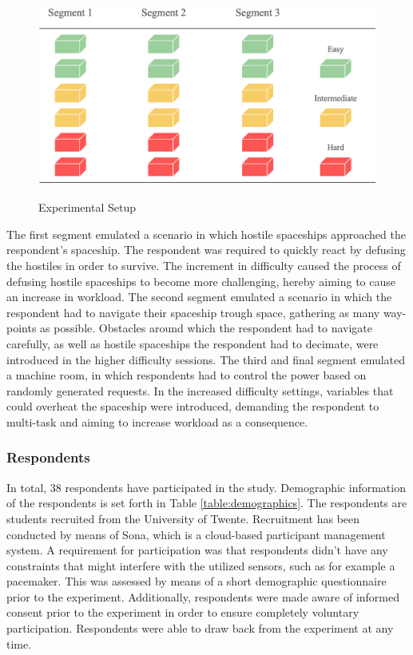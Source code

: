 \documentclass[12pt]{article}
\begin{document}
\begin{figure}
\caption{Experimental Setup}
\bigskip
\includegraphics[scale=0.4]{experimental_setup}
\label{fig:experimental}
\end{figure}

The first segment emulated a scenario in which hostile spaceships approached the respondent's spaceship. The respondent was required to quickly react by defusing the hostiles in order to survive. The increment in difficulty caused the process of defusing hostile spaceships to become more challenging, hereby aiming to cause an increase in workload. The second segment emulated a scenario in which the respondent had to navigate their spaceship trough space, gathering as many way-points as possible. Obstacles around which the respondent had to navigate carefully, as well as hostile spaceships the respondent had to decimate, were introduced in the higher difficulty sessions. The third and final segment emulated a machine room, in which respondents had to control the power based on randomly generated requests. In the increased difficulty settings, variables that could overheat the spaceship were introduced, demanding the respondent to multi-task and aiming to increase workload as a consequence.

\subsubsection{Respondents}
In total, 38 respondents have participated in the study. Demographic information of the respondents is set forth in Table \ref{table:demographics}. The respondents are students recruited from the University of Twente. Recruitment has been conducted by means of Sona, which is a cloud-based participant management system. A requirement for participation was that respondents didn't have any constraints that might interfere with the utilized sensors, such as for example a pacemaker. This was assessed by means of a short demographic questionnaire prior to the experiment. Additionally, respondents were made aware of informed consent prior to the experiment in order to ensure completely voluntary participation. Respondents were able to draw back from the experiment at any time. 
\end{document}
